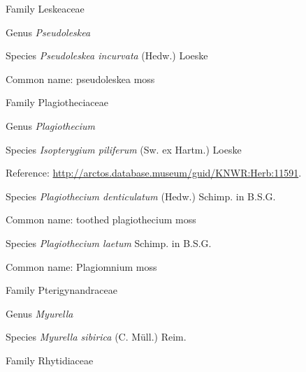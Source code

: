 \documentclass[9pt, article]{memoir}
\begin{document}
\begin{multicols}{2}
\vspace{6pt}\noindent\hspace{24pt}Family Leskeaceae


\vspace{6pt}\noindent\hspace{30pt}Genus \textit{Pseudoleskea}


\vspace{6pt}\noindent\hspace{36pt}Species \textit{Pseudoleskea incurvata} (Hedw.) Loeske


Common name: pseudoleskea moss

\vspace{6pt}\noindent\hspace{24pt}Family Plagiotheciaceae


\vspace{6pt}\noindent\hspace{30pt}Genus \textit{Plagiothecium}


\vspace{6pt}\noindent\hspace{36pt}Species \textit{Isopterygium piliferum} (Sw. ex Hartm.) Loeske


Reference: 
\url{http://arctos.database.museum/guid/KNWR:Herb:11591}.

\vspace{6pt}\noindent\hspace{36pt}Species \textit{Plagiothecium denticulatum} (Hedw.) Schimp. in B.S.G.


Common name: toothed plagiothecium moss

\vspace{6pt}\noindent\hspace{36pt}Species \textit{Plagiothecium laetum} Schimp. in B.S.G.


Common name: Plagiomnium moss

\vspace{6pt}\noindent\hspace{24pt}Family Pterigynandraceae


\vspace{6pt}\noindent\hspace{30pt}Genus \textit{Myurella}


\vspace{6pt}\noindent\hspace{36pt}Species \textit{Myurella sibirica} (C. Müll.) Reim.


\vspace{6pt}\noindent\hspace{24pt}Family Rhytidiaceae



\end{multicols}
\end{document}
